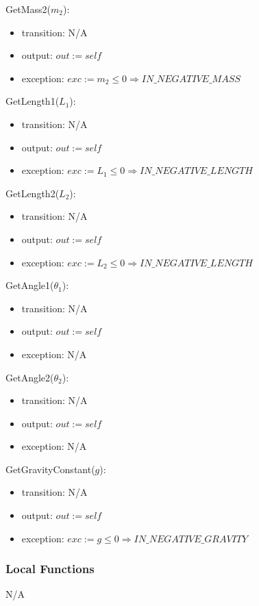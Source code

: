 \documentclass[12pt, titlepage]{article}
\begin{document}
\noindent GetMass2($m_2$):
\begin{itemize}
\item transition: N/A
\item output: $out := self$
\item exception: $exc := m_2 \leq 0 \Rightarrow IN\_NEGATIVE\_MASS$
\end{itemize}

\noindent GetLength1($L_1$):
\begin{itemize}
\item transition: N/A
\item output: $out := self$
\item exception: $exc := L_1 \leq 0 \Rightarrow IN\_NEGATIVE\_LENGTH$
\end{itemize}

\noindent GetLength2($L_2$):
\begin{itemize}
\item transition: N/A
\item output: $out := self$
\item exception: $exc := L_2 \leq 0 \Rightarrow IN\_NEGATIVE\_LENGTH$
\end{itemize}

\noindent GetAngle1($\theta_1$):
\begin{itemize}
\item transition: N/A
\item output: $out := self$
\item exception: N/A
\end{itemize}

\noindent GetAngle2($\theta_2$):
\begin{itemize}
\item transition: N/A
\item output: $out := self$
\item exception: N/A
\end{itemize}


\noindent GetGravityConstant($g$):
\begin{itemize}
\item transition: N/A
\item output: $out := self$
\item exception: $exc := g \leq 0 \Rightarrow IN\_NEGATIVE\_GRAVITY$
\end{itemize}

\subsubsection{Local Functions}
N/A
\end{document}
